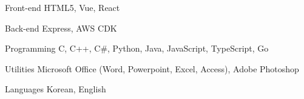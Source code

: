 

\begin{cvskills}


  \cvskill
    {Front-end} %
    {HTML5, Vue, React} %

  \cvskill
    {Back-end} %
    {Express, AWS CDK} %

  \cvskill
    {Programming} %
    {C, C++, C\#, Python, Java, JavaScript, TypeScript, Go} %


  \cvskill
    {Utilities} %
    {Microsoft Office (Word, Powerpoint, Excel, Access), Adobe Photoshop} %

  \cvskill
    {Languages} %
    {Korean, English} %

\end{cvskills}
